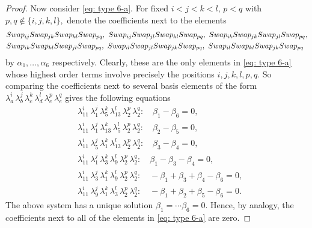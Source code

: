 \documentclass[10pt,a4paper]{amsart}
\begin{document}
\begin{proof}
Now consider \eqref{eq: type 6-a}. For fixed $i < j < k < l,\, p<q$ with $p,q \notin \{i,j,k,l\},$ denote the coefficients next to the elements
\begin{align*}
		&\textnormal{Swap}_{ij} \textnormal{Swap}_{jk} \textnormal{Swap}_{kl}\textnormal{Swap}_{pq}, \ 
		\textnormal{Swap}_{ij} \textnormal{Swap}_{jl} \textnormal{Swap}_{kl}\textnormal{Swap}_{pq},\ 
		\textnormal{Swap}_{ik} \textnormal{Swap}_{jk} \textnormal{Swap}_{jl}\textnormal{Swap}_{pq},\\
		&\textnormal{Swap}_{ik} \textnormal{Swap}_{kl} \textnormal{Swap}_{jl}\textnormal{Swap}_{pq},\ 
		\textnormal{Swap}_{il} \textnormal{Swap}_{jl} \textnormal{Swap}_{jk}\textnormal{Swap}_{pq},\
		\textnormal{Swap}_{il} \textnormal{Swap}_{kl} \textnormal{Swap}_{jk}\textnormal{Swap}_{pq}
\end{align*}
by $\alpha_1,\ldots,\alpha_6$ respectively.
Clearly, these are the only elements in \eqref{eq: type 6-a} whose highest order terms involve precisely the positions $i,j,k,l,p,q.$
So comparing the coefficients next to several basis elements 
of the form $\lambda_a^i\, \lambda_b^j\, \lambda_c^k\, \lambda_d^l\, \lambda_e^p\, \lambda_e^q$ gives the following equations
\begin{equation}\label{eq: sys}
\begin{split}
	&\lambda_{11}^i\, \lambda_1^j\, \lambda_5^k\, \lambda_{13}^l\, \lambda_2^p\, \lambda_2^q:\quad \beta_1-\beta_6=0,\\
	&\lambda_{11}^i\,\lambda_1^j\, \lambda_{13}^k\, \lambda_5^l\, \lambda_2^p\, \lambda_2^q:\quad \beta_2 - \beta_5=0,\\
	&\lambda_{11}^i\, \lambda_5^j\, \lambda_1^k\, \lambda_{13}^l\, \lambda_2^p\, \lambda_2^q:\quad \beta_3 - \beta_4=0,\\
	&\lambda_{11}^i\, \lambda_1^j\, \lambda_3^k\, \lambda_9^l\, \lambda_2^p\, \lambda_2^q: \quad \beta_1 - \beta_3 - \beta_4=0,\\
	&\lambda_{11}^i\, \lambda_3^j\, \lambda_1^k\, \lambda_9^l\, \lambda_2^p\, \lambda_2^q: \quad -\beta_1 + \beta_3 + \beta_4 - \beta_6 =0,\\
	&\lambda_{11}^i\, \lambda_9^j\, \lambda_1^k\, \lambda_3^l\, \lambda_2^p\, \lambda_2^q:\quad -\beta_1 + \beta_2 + \beta_5 - \beta_6 =0.
\end{split}
\end{equation}
The above system has a unique solution $\beta_1= \cdots \beta_6 =0.$ Hence, by analogy, the coefficients next to all of the elements in  \eqref{eq: type 6-a} are zero.




\end{proof}
\end{document}
